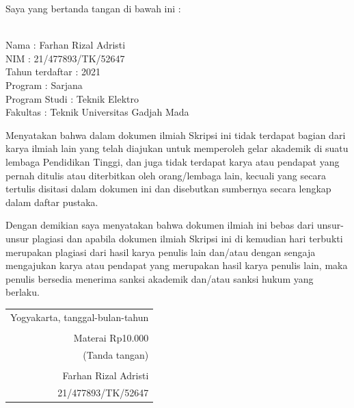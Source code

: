 \noindent Saya yang bertanda tangan di bawah ini :

\vspace{-1em}

\begin{tabbing}
\hspace{40mm} \= \\ %
\noindent Nama \> : Farhan Rizal Adristi \\[\parskip]
\noindent NIM \> : 21/477893/TK/52647 \\[\parskip]
\noindent Tahun terdaftar \> : 2021 \\[\parskip]
\noindent Program \> : Sarjana \\[\parskip]
\noindent Program Studi \> : Teknik Elektro \\[\parskip]
\noindent Fakultas \> : Teknik Universitas Gadjah Mada
\end{tabbing}

\noindent Menyatakan bahwa dalam dokumen ilmiah Skripsi ini tidak terdapat bagian dari karya ilmiah lain yang telah diajukan untuk memperoleh gelar akademik di suatu lembaga Pendidikan Tinggi, dan juga tidak terdapat karya atau pendapat yang pernah ditulis atau diterbitkan oleh orang/lembaga lain, kecuali yang secara tertulis disitasi dalam dokumen ini dan disebutkan sumbernya secara lengkap dalam daftar pustaka.

\noindent Dengan demikian saya menyatakan bahwa dokumen ilmiah ini bebas dari unsur-unsur plagiasi dan apabila dokumen ilmiah Skripsi ini di kemudian hari terbukti merupakan plagiasi dari hasil karya penulis lain dan/atau dengan sengaja mengajukan karya atau pendapat yang merupakan hasil karya penulis lain, maka penulis bersedia menerima sanksi akademik dan/atau sanksi hukum yang berlaku.


\begin{flushright}
	\begin{tabular}{r}
		Yogyakarta, tanggal-bulan-tahun \\
		\vspace{0.1cm} \\
		\tiny{Materai Rp10.000} \\
		\tiny{(Tanda tangan)} \\	
		\vspace{0.1cm} \\
		Farhan Rizal Adristi \\ 21/477893/TK/52647
	\end{tabular}
\end{flushright}